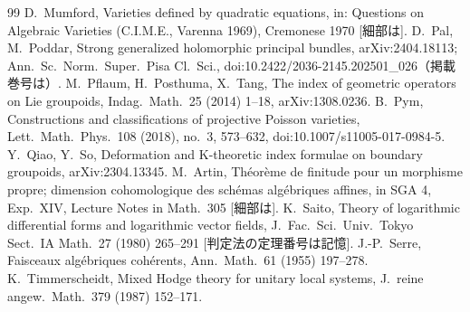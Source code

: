 \begin{thebibliography}{99}
 D.\ Mumford, Varieties defined by quadratic equations, in: Questions on Algebraic Varieties (C.I.M.E., Varenna 1969), Cremonese 1970 [細部は\tQ].
 D.\ Pal, M.\ Poddar, Strong generalized holomorphic principal bundles, arXiv:2404.18113; Ann.\ Sc.\ Norm.\ Super.\ Pisa Cl.\ Sci., doi:10.2422/2036-2145.202501\_026（掲載巻号は\tQ）.
 M.\ Pflaum, H.\ Posthuma, X.\ Tang, The index of geometric operators on Lie groupoids, Indag.\ Math.\ 25 (2014) 1--18, arXiv:1308.0236.
 B.\ Pym, Constructions and classifications of projective Poisson varieties, Lett.\ Math.\ Phys.\ 108 (2018), no.\ 3, 573--632, doi:10.1007/s11005-017-0984-5.
 Y.\ Qiao, Y.\ So, Deformation and K-theoretic index formulae on boundary groupoids, arXiv:2304.13345.
 M.\ Artin, Th\'eor\`eme de finitude pour un morphisme propre; dimension cohomologique des sch\'emas alg\'ebriques affines, in SGA 4, Exp.\ XIV, Lecture Notes in Math.\ 305 [細部は\tQ].
 K.\ Saito, Theory of logarithmic differential forms and logarithmic vector fields, J.\ Fac.\ Sci.\ Univ.\ Tokyo Sect.\ IA Math.\ 27 (1980) 265--291 [判定法の定理番号は記憶\tQ].
 J.-P.\ Serre, Faisceaux alg\'ebriques coh\'erents, Ann.\ Math.\ 61 (1955) 197--278.
 K.\ Timmerscheidt, Mixed Hodge theory for unitary local systems, J.\ reine angew.\ Math.\ 379 (1987) 152--171.
\end{thebibliography}
